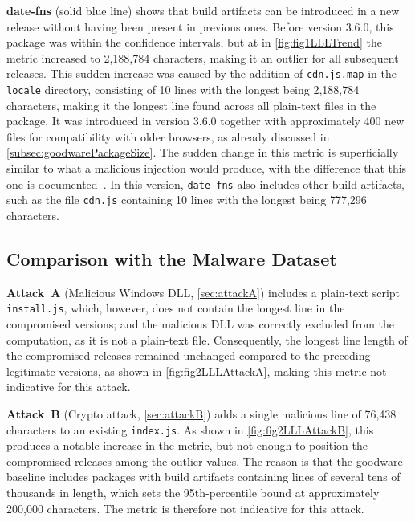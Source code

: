 \textbf{date-fns} (solid blue line) shows that build artifacts can be introduced in a new release without having been present in previous ones.
Before version 3.6.0, this package was within the confidence intervals, 
but at {\large{}} in \cref{fig:fig1LLLTrend} the metric increased to 2,188,784 characters, making it an outlier for all subsequent releases.
This sudden increase was caused by the addition of \texttt{cdn.js.map} in the \texttt{locale} directory, 
consisting of 10 lines with the longest being 2,188,784 characters, making it the longest line found across all plain-text files in the package.
It was introduced in version 3.6.0 together with approximately 400 new files for compatibility with older browsers,
as already discussed in \cref{subsec:goodwarePackageSize}.
The sudden change in this metric is superficially similar to what a malicious injection would produce, 
with the difference that this one is documented~\cite{date-fns_release_notes}.
In this version, \texttt{date-fns} also includes other build artifacts, 
such as the file \texttt{cdn.js} containing 10 lines with the longest being 777,296 characters.

\subsection{Comparison with the Malware Dataset}
\label{subsec:analysisLLLComparisonMalware}

\textbf{Attack~A} (Malicious Windows DLL, \cref{sec:attackA}) includes a plain-text script \texttt{install.js}, 
which, however, does not contain the longest line in the compromised versions; 
and the malicious \ac{DLL} was correctly excluded from the computation, as it is not a plain-text file.
Consequently, the longest line length of the compromised releases remained unchanged compared 
to the preceding legitimate versions, as shown in \cref{fig:fig2LLLAttackA},
making this metric not indicative for this attack.

\textbf{Attack~B} (Crypto attack, \cref{sec:attackB}) adds a single malicious line of 76,438 characters to an existing \texttt{index.js}.
As shown in \cref{fig:fig2LLLAttackB}, this produces a notable increase in the metric,
but not enough to position the compromised releases among the outlier values.
The reason is that the goodware baseline includes packages with build artifacts containing lines of several tens of thousands in length, 
which sets the 95th-percentile bound at approximately 200,000 characters.
The metric is therefore not indicative for this attack.

